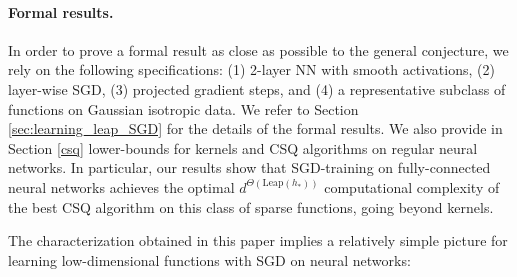 \documentclass[11pt]{article}
\newcommand{\<}{\langle}
\renewcommand{\>}{\rangle}
\theoremstyle{definition}
\def\Leap{\mathrm{Leap}}
\begin{document}
\paragraph{Formal results.} In order to prove a formal result as close as possible to the general conjecture, we rely on the following specifications: (1) 2-layer NN with smooth activations, (2) layer-wise SGD, (3) projected gradient steps, and (4) a representative subclass of functions on Gaussian isotropic data. We refer to Section \ref{sec:learning_leap_SGD} for the details of the formal results. We also provide in Section \ref{csq} lower-bounds for kernels and CSQ algorithms on regular neural networks. In particular, our results show that SGD-training on fully-connected neural networks achieves the optimal $d^{\Theta(\Leap(h_*))}$ computational complexity of the best CSQ algorithm on this class of sparse functions, going beyond kernels.




The characterization obtained in this paper implies a relatively simple picture for learning low-dimensional functions with SGD on neural networks:
\end{document}
